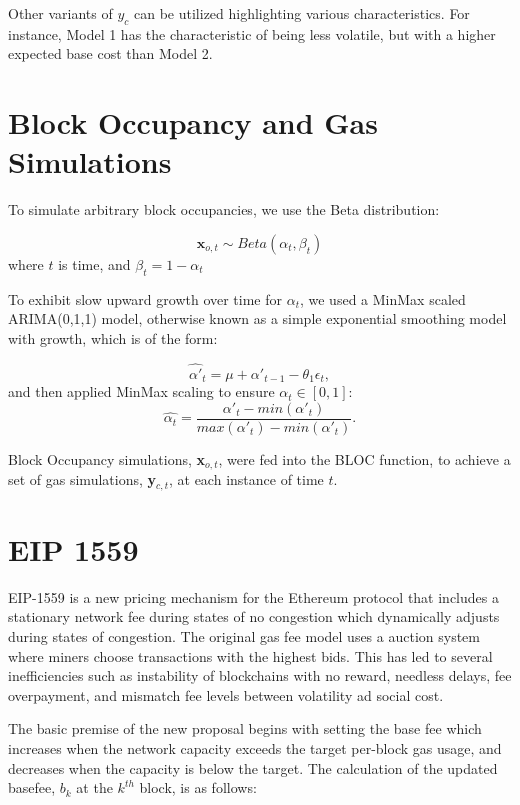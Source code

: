 \documentclass[peerreview]{ieeesyscoin}
\begin{document}
Other variants of $y_{c}$ can be utilized highlighting various characteristics. For instance, Model 1 has the characteristic of being less volatile, but with a higher expected base cost than Model 2.

\section{Block Occupancy and Gas Simulations}

To simulate arbitrary block occupancies, we use the Beta distribution:

 \begin{equation}
\textbf{x}_{o,t} \sim Beta(\alpha_{t},\beta_{t})
 \end{equation}
 where $t$ is time, and $\beta_{t} = 1-\alpha_{t}$
 
To exhibit slow upward growth over time for $\alpha_{t}$, we used a MinMax scaled ARIMA(0,1,1) model, otherwise known as a simple exponential smoothing model with growth, which is of the form:

\begin{equation}
\hat{\alpha'}_{t} = \mu + \alpha'_{t-1} - \theta_{1}\epsilon_{t},
\end{equation}
and then applied MinMax scaling to ensure $\alpha_{t} \in [0,1]$:
\begin{equation}
\hat{\alpha_{t}} = \dfrac{\alpha'_{t} - min(\alpha'_{t})}{  max(\alpha'_{t}) - min(\alpha'_{t}) }.
\end{equation}

Block Occupancy simulations, \textbf{x}$_{o,t}$, were fed into the BLOC function, to achieve a set of gas simulations, \textbf{y}$_{c,t}$, at each instance of time $t$.


\section{EIP 1559}

EIP-1559 is a new pricing mechanism for the Ethereum protocol that includes a stationary network fee during states of no congestion which dynamically adjusts during states of congestion. The original gas fee model uses a auction system where miners choose transactions with the highest bids. This has led to several inefficiencies such as instability of blockchains with no reward, needless delays, fee overpayment, and mismatch fee levels between volatility ad social cost.

The basic premise of the new proposal begins with setting the base fee which increases when the network capacity exceeds the target per-block gas usage, and decreases when the capacity is below the target. The calculation of the updated basefee, $b_{k}$ at the $k^{th}$ block,  is as follows:
\end{document}
